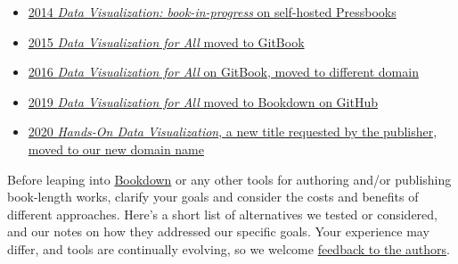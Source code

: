 \documentclass[
  english,
]{book}
\providecommand{\tightlist}{%
  \setlength{\itemsep}{0pt}\setlength{\parskip}{0pt}}
\begin{document}
\begin{itemize}
\tightlist
\item
  \href{https://web.archive.org/web/20140418093523/http://epress.trincoll.edu/dataviz}{2014 \emph{Data Visualization: book-in-progress} on self-hosted Pressbooks}
\item
  \href{https://web.archive.org/web/20150608174937/http://www.datavizbook.org/}{2015 \emph{Data Visualization for All} moved to GitBook}
\item
  \href{https://web.archive.org/web/20160331084618/http://www.datavizforall.org/}{2016 \emph{Data Visualization for All} on GitBook, moved to different domain}
\item
  \href{https://github.com/HandsOnDataViz/book/commit/46cedda17941d42020b4e0ff3bc6336bc9e3da92}{2019 \emph{Data Visualization for All} moved to Bookdown on GitHub}
\item
  \href{https://web.archive.org/web/20200605005118/https://handsondataviz.org/}{2020 \emph{Hands-On Data Visualization}, a new title requested by the publisher, moved to our new domain name}
\end{itemize}

Before leaping into \href{https://bookdown.org}{Bookdown} or any other tools for authoring and/or publishing book-length works, clarify your goals and consider the costs and benefits of different approaches. Here's a short list of alternatives we tested or considered, and our notes on how they addressed our specific goals. Your experience may differ, and tools are continually evolving, so we welcome \href{authors.html}{feedback to the authors}.
\end{document}
